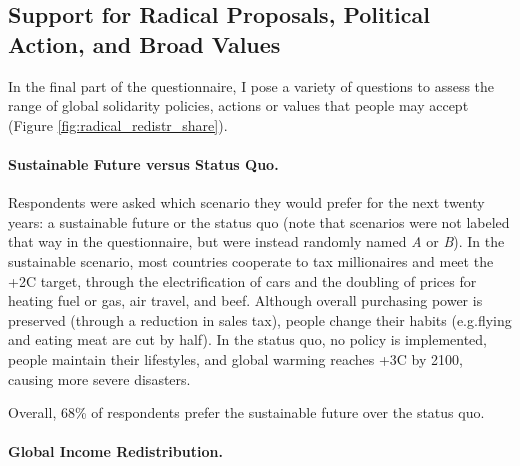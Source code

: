 \documentclass[12pt,english]{article}
\providecommand{\DIFaddtex}[1]{{\protect\color{blue}\uwave{#1}}} %
\providecommand{\DIFaddbegin}{} %
\providecommand{\DIFaddend}{} %
\providecommand{\DIFadd}[1]{\texorpdfstring{\DIFaddtex{#1}}{#1}} %
\providecommand{\DIFaddincludegraphics}[2][]{{\color{blue}\fbox{\DIFOincludegraphics[#1]{#2}}}} %
\DeclareRobustCommand{\DIFaddbegin}{\DIFOaddbegin \let\includegraphics\DIFaddincludegraphics} %
\DeclareRobustCommand{\DIFaddend}{\DIFOaddend \let\includegraphics\DIFOincludegraphics} %
\begin{document}
\subsection{Support for Radical Proposals, Political Action, and Broad Values}\label{subsec:radical}

In the final part of the questionnaire, I pose a variety of questions to assess the range of global solidarity policies, actions or values that people may accept (Figure \ref{fig:radical_redistr_share}).

\paragraph{Sustainable Future versus Status Quo.}\label{par:sustainable_future}

Respondents were asked which scenario they would prefer for the next twenty years: a sustainable future or the status quo (note that scenarios were not labeled that way in the questionnaire, but were instead randomly named \textit{A} or \textit{B}). In the sustainable scenario, most countries cooperate to tax millionaires and meet the +2\textdegree{}C target, through the electrification of cars and the doubling of prices for heating fuel or gas, air travel, and beef. Although overall purchasing power is preserved (through a reduction in sales tax), people change their habits (e.g.\DIFaddbegin \DIFadd{, }\DIFaddend flying and eating meat are cut by half). In the status quo, no policy is implemented, people maintain their lifestyles, and global warming reaches +3\textdegree{}C by 2100, causing more severe disasters.

Overall, 68\% of respondents prefer the sustainable future over the status quo.

\paragraph{Global Income Redistribution.}\label{par:global_income_redistr}
\end{document}
